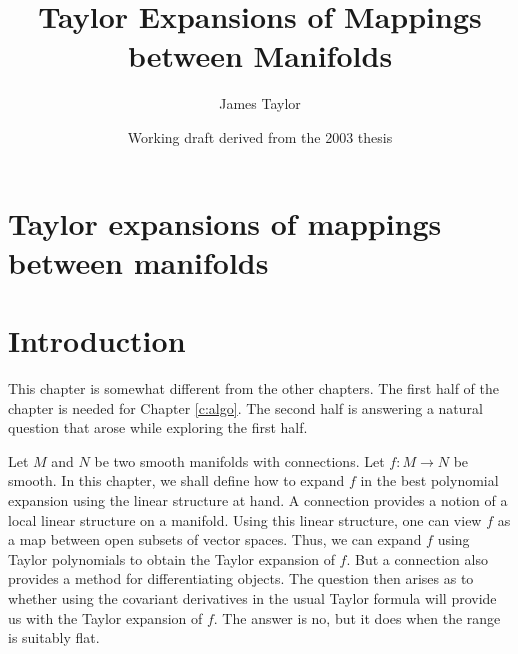 \documentclass[11pt]{article}
\title{Taylor Expansions of Mappings between Manifolds}
\author{James Taylor}
\date{Working draft derived from the 2003 thesis}
\theoremstyle{remark}
\begin{document}
\maketitle

\section{Taylor expansions of mappings between
manifolds} \label{c:taylor}


\section{Introduction} \label{s:intro}
This chapter is somewhat different from the other chapters. The first
half of the chapter is needed for Chapter \ref{c:algo}. The second
half is answering a natural question that arose while exploring the
first half. 


Let $M$ and $N$ be two smooth manifolds with connections. Let $f: M
\to N$ be smooth. In this chapter, we shall define how to expand $f$
in the best polynomial expansion using the linear structure at hand. 
A connection provides a notion of a local linear
structure on a manifold. Using this linear structure, one can view $f$
as a map between open subsets of vector spaces. Thus, we can expand
$f$ using Taylor polynomials to obtain the Taylor expansion of $f$. 
But a connection also provides a method
for differentiating objects. The question then arises as to whether
using the covariant derivatives in the usual Taylor formula will
provide us with the Taylor expansion of $f$. The answer is no, but it
does when the range is suitably flat.
\end{document}
